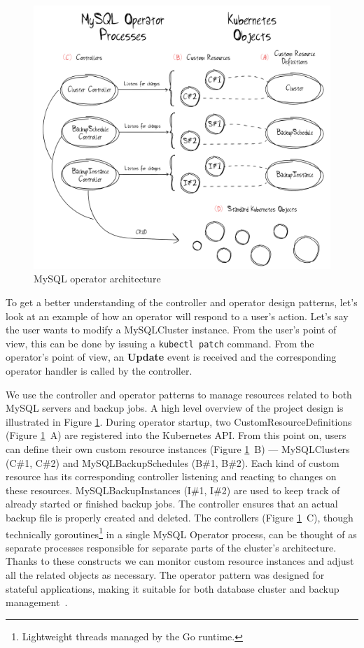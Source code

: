 \begin{figure}[!ht]
    \centering
    \includegraphics[width=1\textwidth, angle=0]{img/Design.pdf}
    \caption{MySQL operator architecture}
    \label{fig:design}
\end{figure}

To get a better understanding of the controller and operator design patterns, let's look at an
example of how an operator will respond to a user's action. Let's say the user wants to modify a
MySQLCluster instance. From the user's point of view, this can be done by issuing a
\texttt{kubectl patch} command. From the operator's point of view, an \textbf{Update} event is
received and the corresponding operator handler is called by the controller.

We use the controller and operator patterns to manage resources related to both
MySQL servers and backup jobs. A high level overview of the project design is
illustrated in Figure \ref{fig:design}. During operator startup, two
CustomResourceDefinitions (Figure \ref{fig:design}~A) are registered into the Kubernetes API.
From this point on, users can define their own custom resource instances (Figure \ref{fig:design}~B) ---
MySQLClusters (C\#1, C\#2) and MySQLBackupSchedules (B\#1, B\#2). Each kind of
custom resource has its corresponding controller listening and reacting to changes on these
resources. MySQLBackupInstances (I\#1, I\#2) are used to keep track of already started or finished backup jobs.
The controller ensures that an actual backup file is properly created and deleted.
The controllers (Figure \ref{fig:design}~C), though technically
goroutines\footnote{Lightweight threads managed by the Go runtime.} in a single
MySQL Operator process, can be thought of as separate processes responsible for separate parts of the
cluster's architecture. Thanks to these constructs we can monitor custom resource instances and adjust
all the related objects as necessary. The operator pattern was designed for stateful applications, making
it suitable for both database cluster and backup management~\cite{coreos}.

